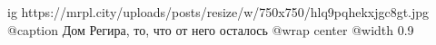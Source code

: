  
 
 
 
 

\ifcmt
  ig https://mrpl.city/uploads/posts/resize/w/750x750/hlq9pqhekxjgc8gt.jpg
	@caption Дом Регира, то, что от него осталось
  @wrap center
  @width 0.9
\fi
